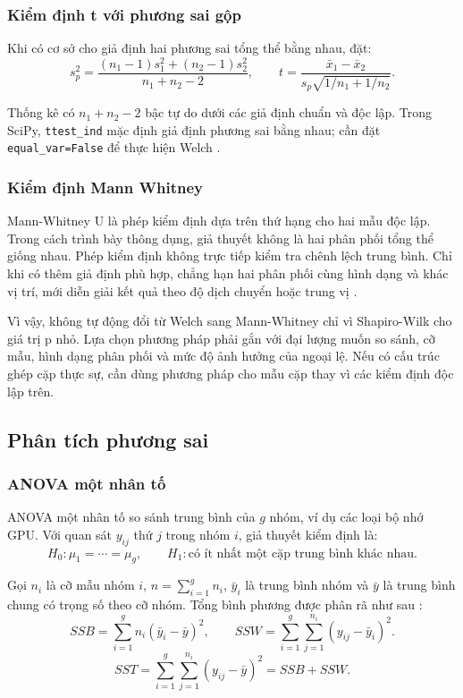 \subsubsection{Kiểm định t với phương sai gộp}

Khi có cơ sở cho giả định hai phương sai tổng thể bằng nhau, đặt:
\nopagebreak[4]
\[s_p^2=\frac{(n_1-1)s_1^2+(n_2-1)s_2^2}{n_1+n_2-2},\qquad
t=\frac{\bar x_1-\bar x_2}{s_p\sqrt{1/n_1+1/n_2}}.\]

Thống kê có \(n_1+n_2-2\) bậc tự do dưới các giả định chuẩn và độc lập. Trong SciPy, \texttt{ttest\_ind} mặc định giả định phương sai bằng nhau; cần đặt \texttt{equal\_var=False} để thực hiện Welch \cite{ref5}.

\subsubsection{Kiểm định Mann Whitney}

Mann-Whitney U là phép kiểm định dựa trên thứ hạng cho hai mẫu độc lập. Trong cách trình bày thông dụng, giả thuyết không là hai phân phối tổng thể giống nhau. Phép kiểm định không trực tiếp kiểm tra chênh lệch trung bình. Chỉ khi có thêm giả định phù hợp, chẳng hạn hai phân phối cùng hình dạng và khác vị trí, mới diễn giải kết quả theo độ dịch chuyển hoặc trung vị \cite{ref6}.

Vì vậy, không tự động đổi từ Welch sang Mann-Whitney chỉ vì Shapiro-Wilk cho giá trị p nhỏ. Lựa chọn phương pháp phải gắn với đại lượng muốn so sánh, cỡ mẫu, hình dạng phân phối và mức độ ảnh hưởng của ngoại lệ. Nếu có cấu trúc ghép cặp thực sự, cần dùng phương pháp cho mẫu cặp thay vì các kiểm định độc lập trên.

\subsection{Phân tích phương sai}

\subsubsection{ANOVA một nhân tố}

ANOVA một nhân tố so sánh trung bình của \(g\) nhóm, ví dụ các loại bộ nhớ GPU. Với quan sát \(y_{ij}\) thứ \(j\) trong nhóm \(i\), giả thuyết kiểm định là:
\nopagebreak[4]
\[H_0:\mu_1=\cdots=\mu_g,\qquad H_1:\text{có ít nhất một cặp trung bình khác nhau}.\]

Gọi \(n_i\) là cỡ mẫu nhóm \(i\), \(n=\sum_{i=1}^{g}n_i\), \(\bar y_i\) là trung bình nhóm và \(\bar y\) là trung bình chung có trọng số theo cỡ nhóm. Tổng bình phương được phân rã như sau \cite{ref7}:
\nopagebreak[4]
\[SSB=\sum_{i=1}^{g}n_i(\bar y_i-\bar y)^2,\qquad
SSW=\sum_{i=1}^{g}\sum_{j=1}^{n_i}(y_{ij}-\bar y_i)^2.\]
\nopagebreak[4]
\[SST=\sum_{i=1}^{g}\sum_{j=1}^{n_i}(y_{ij}-\bar y)^2=SSB+SSW.\]

